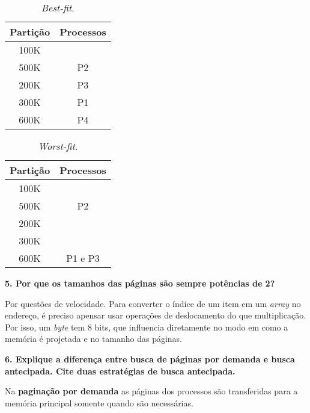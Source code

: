 \documentclass[12pt,a4paper]{article}
\newcommand{\pergunta}[1]{\noindent \textbf{#1}}
\begin{document}
\begin{table}[!ht]
\begin{center}
	\begin{tabular}{| c | c |}
	\hline \textbf{Partição} & \textbf{Processos} \\ \hline
	{\ttfamily 100K} &  \\ \hline
	{\ttfamily 500K} & {\ttfamily P2} \\ \hline
	{\ttfamily 200K} & {\ttfamily P3} \\ \hline
	{\ttfamily 300K} & {\ttfamily P1} \\ \hline
	{\ttfamily 600K} & {\ttfamily P4} \\ \hline
	\end{tabular}
	\caption{\textsl{Best-fit}.}
\end{center}
\end{table}

\begin{table}[!ht]
\begin{center}
	\begin{tabular}{| c | c |}
	\hline \textbf{Partição} & \textbf{Processos} \\ \hline
	{\ttfamily 100K} &  \\ \hline
	{\ttfamily 500K} & {\ttfamily P2} \\ \hline
	{\ttfamily 200K} & \\ \hline
	{\ttfamily 300K} & {\ttfamily } \\ \hline
	{\ttfamily 600K} & {\ttfamily P1 e P3} \\ \hline
	\end{tabular}
	\caption{\textsl{Worst-fit}.}
\end{center}
\end{table}

\pergunta{5. Por que os tamanhos das páginas são sempre potências de 2?}

Por questões de velocidade.  Para converter o índice de um item em um
\textsl{array} no endereço, é preciso apensar usar operações de 
deslocamento do que multiplicação.  Por isso, um \textsl{byte} tem 8 bits,
que influencia diretamente no modo em como a memória é projetada e no
tamanho das páginas.

\pergunta {6. Explique a diferença entre busca de páginas por demanda e busca 
antecipada. Cite duas estratégias de busca antecipada.}

Na \textbf{paginação por demanda} as páginas dos processos são transferidas para
a memória principal somente	quando são necessárias.
\end{document}
